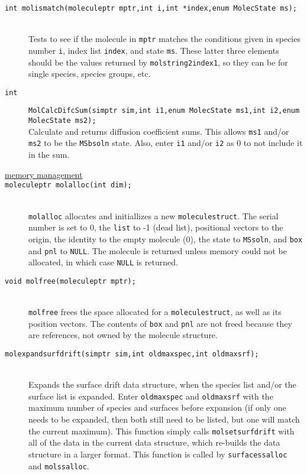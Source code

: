 \documentclass {scrbook}
\newcommand {\ttt} {\texttt}
\begin{document}
\begin{description}
\item[\ttt{int molismatch(moleculeptr mptr,int i,int *index,enum MolecState ms);}]
\hfill \\
Tests to see if the molecule in \ttt{mptr} matches the conditions given in species number \ttt{i}, index list \ttt{index}, and state \ttt{ms}. These latter three elements should be the values returned by \ttt{molstring2index1}, so they can be for single species, species groups, etc.

\item[\ttt{int}]
\ttt{MolCalcDifcSum(simptr sim,int i1,enum MolecState ms1,int i2,enum MolecState ms2);}
\hfill \\
Calculate and returns diffusion coefficient sums. This allows \ttt{ms1} and/or \ttt{ms2} to be the \ttt{MSbsoln} state. Also, enter \ttt{i1} and/or \ttt{i2} as 0 to not include it in the sum.

\item[\underline{memory management}]

\item[\ttt{moleculeptr molalloc(int dim);}]
\hfill \\
\ttt{molalloc} allocates and initiallizes a new \ttt{moleculestruct}. The serial number is set to 0, the \ttt{list} to -1 (dead list), positional vectors to the origin, the identity to the empty molecule (0), the state to \ttt{MSsoln}, and \ttt{box} and \ttt{pnl} to \ttt{NULL}. The molecule is returned unless memory could not be allocated, in which case \ttt{NULL} is returned.

\item[\ttt{void molfree(moleculeptr mptr);}]
\hfill \\
\ttt{molfree} frees the space allocated for a \ttt{moleculestruct}, as well as its position vectors. The contents of \ttt{box} and \ttt{pnl} are not freed because they are references, not owned by the molecule structure.

\item[\ttt{molexpandsurfdrift(simptr sim,int oldmaxspec,int oldmaxsrf);}]
\hfill \\
Expands the surface drift data structure, when the species list and/or the surface list is expanded. Enter \ttt{oldmaxspec} and \ttt{oldmaxsrf} with the maximum number of species and surfaces before expansion (if only one needs to be expanded, then both still need to be listed, but one will match the current maximum). This function simply calls \ttt{molsetsurfdrift} with all of the data in the current data structure, which re-builds the data structure in a larger format. This function is called by \ttt{surfacessalloc} and \ttt{molssalloc}.


\end{description}
\end{document}
